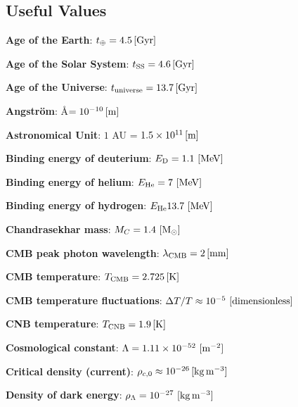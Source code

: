 \documentclass[a4paper,11pt]{article}
\begin{document}

\newpage
\subsection{Useful Values}

{\noindent}\textbf{Age of the Earth}: $t_\oplus = 4.5\,[{\rm Gyr}]$

{\noindent}\textbf{Age of the Solar System}: $t_\mathrm{SS} = 4.6\,[{\rm Gyr}]$

{\noindent}\textbf{Age of the Universe}: $t_\mathrm{universe} = 13.7\,[{\rm Gyr}]$

{\noindent}\textbf{Angstr\"{o}m}: \AA$ = 10^{-10}\,[{\rm m}]$

{\noindent}\textbf{Astronomical Unit}: $1$ AU = $1.5\times10^{11}\,[{\rm m}]$

{\noindent}\textbf{Binding energy of deuterium}: $E_\mathrm{D} = 1.1 ~ [{\rm MeV}]$

{\noindent}\textbf{Binding energy of helium}: $E_\mathrm{He} = 7 ~ [{\rm MeV}]$

{\noindent}\textbf{Binding energy of hydrogen}: $E_\mathrm{He} 13.7 ~ [{\rm MeV}]$

{\noindent}\textbf{Chandrasekhar mass}: $M_C = 1.4 ~ [{\rm M_\odot}]$

{\noindent}\textbf{CMB peak photon wavelength}: $\lambda_\mathrm{CMB} = 2\,[{\rm mm}]$

{\noindent}\textbf{CMB temperature}: $T_\mathrm{CMB} = 2.725\,[{\rm K}]$

{\noindent}\textbf{CMB temperature fluctuations}: $\Delta T/T\approx10^{-5} ~ [{\rm dimensionless}]$

{\noindent}\textbf{CNB temperature}: $T_\mathrm{CNB} = 1.9\,[{\rm K}]$

{\noindent}\textbf{Cosmological constant}: $\Lambda=1.11\times10^{-52} ~ [{\rm m^{-2}}]$

{\noindent}\textbf{Critical density (current)}: $\rho_{c,0}\approx10^{-26}\,[{\rm kg\,m^{-3}}]$

{\noindent}\textbf{Density of dark energy}: $\rho_\Lambda = 10^{-27} ~ [{\rm kg\,m^{-3}}]$
\end{document}
